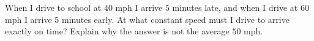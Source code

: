 When I drive to school at $40$ mph I arrive $5$ minutes late, and when I drive at $60$ mph I arrive $5$ minutes early. At what constant speed must I drive to arrive exactly on time? Explain why the answer is not the average $50$ mph.
